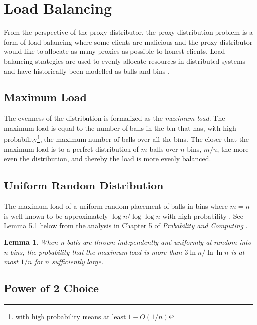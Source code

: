 \section{Load Balancing} 

From the perspective of the proxy distributor, the proxy distribution problem is a form of load balancing where some clients are malicious and the proxy distributor would like to allocate as many proxies as possible to honest clients. Load balancing strategies are used to evenly allocate resources in distributed systems and have historically been modelled as balls and bins \cite{mitzenmacher2005probability}. 

\subsection{Maximum Load}

The evenness of the distribution is formalized as the \textit{maximum load}. The maximum load is equal to the number of balls in the bin that has, with high probability\footnote{with high probability means at least $1 - O(1/n)$}, the maximum number of balls over all the bins. The closer that the maximum load is to a perfect distribution of $m$ balls over $n$ bins, $m/n$, the more even the distribution, and thereby the load is more evenly balanced. 

\subsection{Uniform Random Distribution} 

The maximum load of a uniform random placement of balls in bins where $m=n$ is well known to be approximately $\log n / \log \log n$ with high probability \cite{gonnet1981expected}.
See Lemma 5.1 below from the analysis in Chapter 5 of \textit{Probability and Computing} \cite{mitzenmacher2005probability}. 

\newtheorem{lemma}[theorem]{Lemma}

\begin{lemma} When n balls are thrown independently and uniformly at random into n bins, the probability that the maximum load is more than $3 \ln n / \ln \ln n$ is at most $1/n$ for $n$ sufficiently large.
\end{lemma}


\subsection{Power of 2 Choice} 

